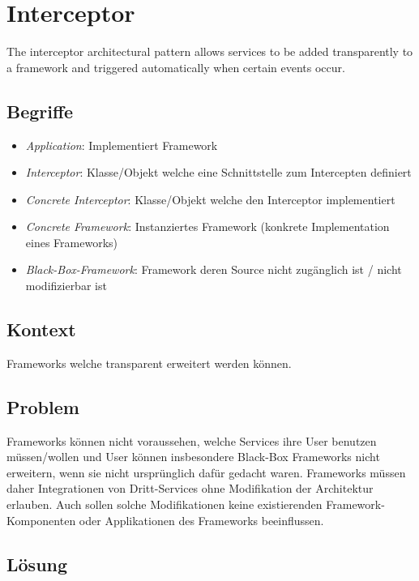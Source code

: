 \section{Interceptor}
\label{sec:interceptor}

The interceptor architectural pattern allows services to be added transparently to a framework and triggered automatically when certain events occur.


\subsection{Begriffe}

\begin{itemize}
	\item \emph{Application}: Implementiert Framework
	\item \emph{Interceptor}: Klasse/Objekt welche eine Schnittstelle zum Intercepten definiert
	\item \emph{Concrete Interceptor}: Klasse/Objekt welche den Interceptor implementiert
	\item \emph{Concrete Framework}: Instanziertes Framework (konkrete Implementation eines Frameworks)
	\item \emph{Black-Box-Framework}: Framework deren Source nicht zugänglich ist / nicht modifizierbar ist
\end{itemize}


\subsection{Kontext}

Frameworks welche transparent erweitert werden können.


\subsection{Problem}

Frameworks können nicht voraussehen, welche Services ihre User benutzen müssen/wollen und User können insbesondere Black-Box Frameworks nicht erweitern, wenn sie nicht ursprünglich dafür gedacht waren.
Frameworks müssen daher Integrationen von Dritt-Services ohne Modifikation der Architektur erlauben. Auch sollen solche Modifikationen keine existierenden Framework-Komponenten oder Applikationen des Frameworks beeinflussen.


\subsection{Lösung}

